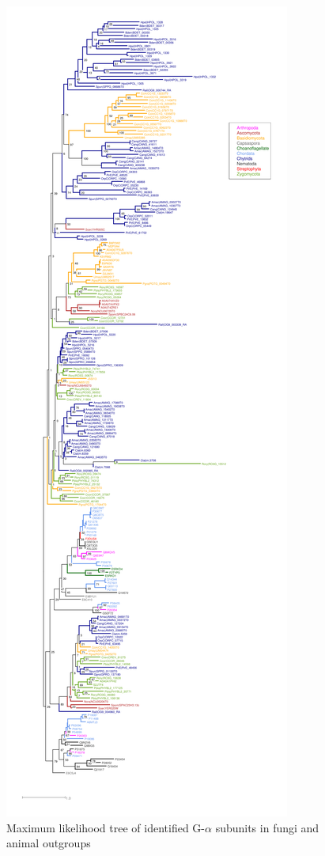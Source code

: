 \begin{figure}[hb]
  \centering
  \includegraphics{./Chapter_RhodAux/img/Galpha_tree.png}
  \caption[G$\alpha$ tree]{Maximum likelihood tree of identified G-$\alpha$ subunits in fungi and animal outgroups}
  \label{fig:ChRhodA_GalphaTree}
\end{figure}


